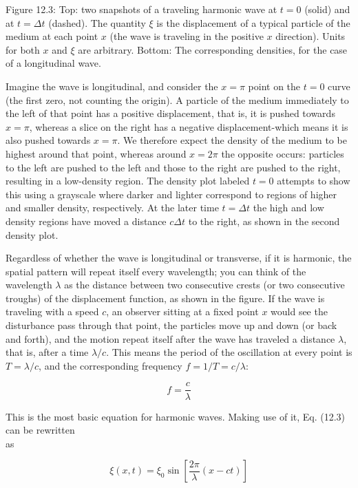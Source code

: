 \documentclass[10pt]{article}
\begin{document}
Figure 12.3: Top: two snapshots of a traveling harmonic wave at $t=0$ (solid) and at $t=\Delta t$ (dashed). The quantity $\xi$ is the displacement of a typical particle of the medium at each point $x$ (the wave is traveling in the positive $x$ direction). Units for both $x$ and $\xi$ are arbitrary. Bottom: The corresponding densities, for the case of a longitudinal wave.

Imagine the wave is longitudinal, and consider the $x=\pi$ point on the $t=0$ curve (the first zero, not counting the origin). A particle of the medium immediately to the left of that point has a positive displacement, that is, it is pushed towards $x=\pi$, whereas a slice on the right has a negative displacement-which means it is also pushed towards $x=\pi$. We therefore expect the density of the medium to be highest around that point, whereas around $x=2 \pi$ the opposite occurs: particles to the left are pushed to the left and those to the right are pushed to the right, resulting in a low-density region. The density plot labeled $t=0$ attempts to show this using a grayscale where darker and lighter correspond to regions of higher and smaller density, respectively. At the later time $t=\Delta t$ the high and low density regions have moved a distance $c \Delta t$ to the right, as shown in the second density plot.

Regardless of whether the wave is longitudinal or transverse, if it is harmonic, the spatial pattern will repeat itself every wavelength; you can think of the wavelength $\lambda$ as the distance between two consecutive crests (or two consecutive troughs) of the displacement function, as shown in the figure. If the wave is traveling with a speed $c$, an observer sitting at a fixed point $x$ would see the disturbance pass through that point, the particles move up and down (or back and forth), and the motion repeat itself after the wave has traveled a distance $\lambda$, that is, after a time $\lambda / c$. This means the period of the oscillation at every point is $T=\lambda / c$, and the corresponding frequency $f=1 / T=c / \lambda:$


\begin{equation*}
f=\frac{c}{\lambda} \tag{12.4}
\end{equation*}


This is the most basic equation for harmonic waves. Making use of it, Eq. (12.3) can be rewritten\\
as


\begin{equation*}
\xi(x, t)=\xi_{0} \sin \left[\frac{2 \pi}{\lambda}(x-c t)\right] \tag{12.5}
\end{equation*}
\end{document}
